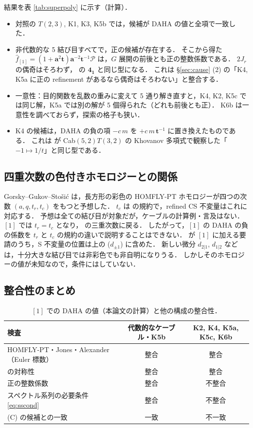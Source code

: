 \documentclass[11pt,a4paper]{ltjsarticle}
\theoremstyle{definition}
\theoremstyle{remark}
\newcommand{\ba}{\mathbf{a}}
\newcommand{\bt}{\mathbf{t}}
\newcommand{\hf}{\widehat{f}}
\begin{document}
結果を表 \ref{tab:superpoly} に示す（計算）．
\begin{itemize}
\item 対照の $T(2,3)$, K1, K3, K5b では，候補が DAHA の値と全項で一致した．
\item 非代数的な 5 結び目すべてで，正の候補が存在する．
  そこから得た $\hf_{[1]}=(1+\ba^2\bt)\ba^{-2}\bt^{-1}\mathcal{P}$ は，$G$ 展開の前後とも正の整数係数である．
  $2J_r$ の偶奇はそろわず，\cite{KN} の $\mathbf{4_1}$ と同じ型になる．
  これは \S\ref{sec:cause} (2) の「K4, K5a に正の refinement があるなら偶奇はそろわない」と整合する．
\item 一意性：目的関数を乱数の重みに変えて 5 通り解き直すと，K4, K2, K5c では同じ解，K5a では別の解が 5 個得られた（どれも前後とも正）．
  K6b は一意性を調べておらず，探索の格子も狭い．
\item K4 の候補は，DAHA の負の項 $-c\,m$ を $+c\,m\,\bt^{-1}$ に置き換えたものである．
  これは \cite{CD14} が Cab$(5,2)T(3,2)$ の Khovanov 多項式で観察した「$-1\mapsto1/t$」と同じ型である．
\end{itemize}

\subsection{四重次数の色付きホモロジーとの関係}

Gorsky--Gukov--Stošić \cite{GGS} は，長方形の彩色の HOMFLY-PT ホモロジーが四つの次数 $(a,q,t_r,t_c)$ をもつと予想した．
$t_c$ は \cite{AS,DGR} の規約で，refined CS 不変量はこれに対応する．
予想は全ての結び目が対象だが，ケーブルの計算例・言及はない．
$[1]$ では $t_r=t_c$ となり，\cite{DGR} の三重次数に戻る．
したがって，$[1]$ の DAHA の負の係数を $t_r$ と $t_c$ の規約の違いで説明することはできない．
\cite{GGS} が $[1]$ に加える要請のうち，S 不変量の位置は上の ($d_{\pm1}$) に含めた．
新しい微分 $d_{2|1}$, $d_{1|2}$ などは，十分大きな結び目では非彩色でも非自明になりうる．
しかしそのホモロジーの値が未知なので，条件にはしていない．

\subsection{整合性のまとめ}

\begin{table}[h]
\centering
\caption{$[1]$ での DAHA の値（本論文の計算）と他の構成の整合性．}\label{tab:consistency}
\small
\begin{tabular}{lcc}
\toprule
検査 & 代数的なケーブル・K5b & K2, K4, K5a, K5c, K6b \\
\midrule
HOMFLY-PT・Jones・Alexander（Euler 標数） & 整合 & 整合 \\
\cite{DGR} の対称性 & 整合 & 整合 \\
正の整数係数 & 整合 & 不整合 \\
スペクトル系列の必要条件 \eqref{eq:sscond} & 整合 & 不整合 \\
(C) の候補との一致 & 一致 & 不一致 \\
\bottomrule
\end{tabular}
\end{table}
\end{document}

